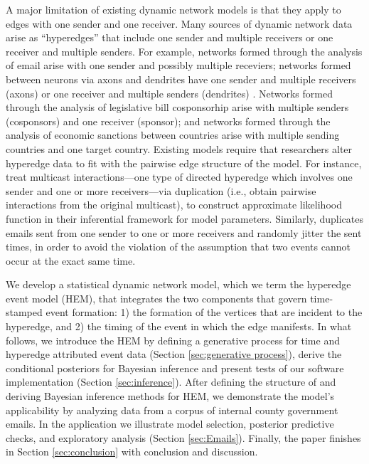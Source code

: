 \documentclass[ba]{imsart}
\numberwithin{equation}{section}
\theoremstyle{plain}
\begin{document}
A major limitation of existing dynamic network models is that they apply to edges with one sender and one receiver. Many sources of dynamic network data arise as ``hyperedges'' \citep{karypis1999multilevel,ghoshal2009random,zlatic2009hypergraph,zhang2010hypergraph} that include one sender and multiple receivers or one receiver and multiple senders. For example, networks formed through the analysis of email \citep{newman2002email} arise with one sender and possibly multiple receviers;  networks formed between neurons via axons and dendrites have one sender and multiple receivers (axons) or one receiver and multiple senders (dendrites) \citep{partzsch2012developing}. Networks formed through the analysis of legislative bill cosponsorhip \citep{fowler2006legislative} arise with multiple senders (cosponsors) and one receiver (sponsor); and networks formed through the analysis of economic sanctions \citep{cranmer2014reciprocity} between countries arise with multiple sending countries and one target country. Existing models require that researchers alter hyperedge data to fit with the pairwise edge structure of the model. For instance, \cite{PerryWolfe2012} treat multicast interactions---one type of directed hyperedge which involves one sender and one or more receivers---via duplication (i.e., obtain pairwise interactions from the original multicast), to construct approximate likelihood function in their inferential framework for model parameters. Similarly, \cite{fan2009learning} duplicates emails sent from one sender to one or more receivers and randomly jitter the sent times, in order to avoid the violation of the assumption that two events cannot occur at the exact same time. %

We develop a statistical dynamic network model, which we term the hyperedge event model (HEM), that integrates the two components that govern time-stamped event formation: 1) the formation of the vertices that are incident to the hyperedge, and 2) the timing of the event in which the edge manifests. In what follows, we introduce the HEM by defining a generative process for time and hyperedge attributed event data (Section \ref{sec:generative process}), derive the conditional posteriors for Bayesian inference and present tests of our software implementation (Section \ref{sec:inference}). After defining the structure of and deriving Bayesian inference methods for HEM, we demonstrate the model's applicability by analyzing data from a corpus of internal county government emails.  In the application we illustrate model selection, posterior predictive checks, and exploratory analysis (Section \ref{sec:Emails}). Finally, the paper finishes in Section \ref{sec:conclusion} with conclusion and discussion.
\end{document}

